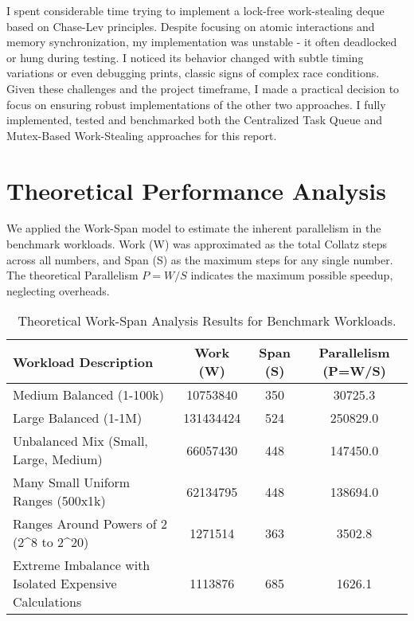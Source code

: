 \documentclass[10pt]{article}
\begin{document}
I spent considerable time trying to implement a lock-free work-stealing deque based on Chase-Lev principles. Despite focusing on atomic interactions and memory synchronization, my implementation was unstable - it often deadlocked or hung during testing. I noticed its behavior changed with subtle timing variations or even debugging prints, classic signs of complex race conditions. Given these challenges and the project timeframe, I made a practical decision to focus on ensuring robust implementations of the other two approaches. I fully implemented, tested and benchmarked both the Centralized Task Queue and Mutex-Based Work-Stealing approaches for this report.
\section{Theoretical Performance Analysis}

We applied the Work-Span model to estimate the inherent parallelism in the benchmark workloads. Work (W) was approximated as the total Collatz steps across all numbers, and Span (S) as the maximum steps for any single number. The theoretical Parallelism $P = W/S$ indicates the maximum possible speedup, neglecting overheads.

\begin{table}[H] %
    \centering
    \caption{Theoretical Work-Span Analysis Results for Benchmark Workloads.}
    \label{tab:theoretical}
    \begin{tabular}{@{}l S[table-format=9.0] S[table-format=3.0] S[table-format=6.1]@{}} %
        \toprule
        Workload Description                                                      & {Work (W)} & {Span (S)} & {Parallelism (P=W/S)} \\ \midrule
        Medium Balanced (1-100k)                                                  & 10753840   & 350        & 30725.3               \\
        Large Balanced (1-1M)                                                     & 131434424  & 524        & 250829.0              \\
        Unbalanced Mix (Small, Large, Medium)                                     & 66057430   & 448        & 147450.0              \\
        Many Small Uniform Ranges (500x1k)                                        & 62134795   & 448        & 138694.0              \\
        Ranges Around Powers of 2 (2\textasciicircum{}8 to 2\textasciicircum{}20) & 1271514    & 363        & 3502.8                \\
        Extreme Imbalance with Isolated Expensive Calculations                    & 1113876    & 685        & 1626.1                \\ \bottomrule
    \end{tabular}
\end{table}
\end{document}
